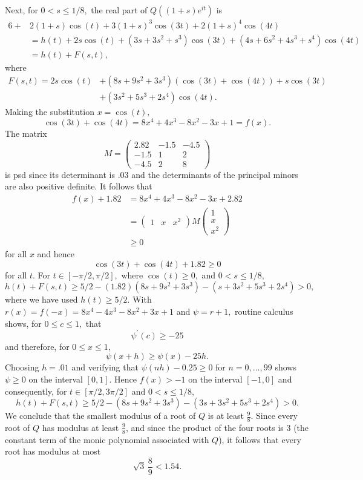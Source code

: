 \documentclass[a4paper,reqno,index]{amsart}
\numberwithin{equation}{section}
\theoremstyle{definition}
\begin{document}
Next, for $0<s \le 1/8,$ 
 the real part of $Q((1+s) e^{it})$ is
 \[
 \begin{split}
  6+ & 2(1+s)\cos(t)+3(1+s)^3 \cos(3t)+ 2(1+s)^4\cos(4t) 
  \\ &  = h(t) +  2s\cos(t) + (3s+3s^2+s^3)\cos(3t) + (4s+6s^2+4s^3+s^4)\cos(4t)
\\  & = h(t)+F(s,t), 
\end{split}
\]
where
\[
\begin{split}
 F(s,t)= 2s\cos(t) & + (8s+9s^2+3s^3)\left(\cos(3t)+\cos(4t)\right)
  + s\cos(3t) \\ & + (3s^2+5s^3+2s^4)\cos(4t).
 \end{split}
\]
 Making the substitution $x=\cos(t),$
\[
 \cos(3t)+\cos(4t)  = 8x^4+4x^3 -8x^2-3x+1 = f(x).
\]
  The matrix
 \[
   M=\begin{pmatrix} 2.82 & -1.5 & -4.5\\
      -1.5 & 1 & 2 \\ -4.5 & 2 & 8 \end{pmatrix}
 \]
 is psd since its determinant is $.03$ and 
 the determinants of the principal minors are also positive definite. It follows that
\begin{align*}
f(x) + 1.82 &= 8x^4+4x^3 -8x^2-3x+2.82  \\
&=\begin{pmatrix}
1 & x & x^2
\end{pmatrix} M \begin{pmatrix}
1 \\ x \\ x^2
\end{pmatrix}  \\
&\ge 0
\end{align*}
 for all $x$ and hence
\[
 \cos(3t)+\cos(4t) + 1.82 \ge 0
\]
 for all $t.$
  For $t\in [-\pi/2,\pi/2],$ where $\cos(t)\ge 0,$  and $0<s \le 1/8,$
\[
  h(t) +  F(s,t) \ge 
  5/2 -(1.82)(8s+9s^2+3s^3) - (s+3s^2+5s^3+2s^4) >0,
\]
where we have used $h(t)\ge 5/2.$
  With $r(x)=f(-x)= 8x^4-4x^3-8x^2+3x+1$ and
  $\psi=r+1,$ routine calculus shows, for $0\le c \le 1,$
  that
\[
 \psi^\prime(c) \ge -25
\]
  and therefore, for $0\le x \le 1,$
\[
  \psi(x+h) \ge \psi(x)-25h.
\]
  Choosing $h=.01$ and verifying that $\psi(nh)-0.25 \ge 0$
  for $n=0,\dots,99$ shows $\psi \ge 0$ on the interval
  $[0,1].$ Hence  $f(x) >-1$ on the interval $[-1,0]$
  and consequently, for $t\in [\pi/2,3\pi/2]$ and $0<s \le 1/8,$
\[
  h(t) + F(s,t) 
  \ge 5/2 - (8s+9s^2+3s^3) - (3s+3s^2+5s^3+2s^4) >0.
\]
We conclude that the smallest modulus of a root of \(Q\) is at least
\(\frac{9}{8}\). Since every root of \(Q\) has modulus at least
\(\frac{9}{8}\), and since the product of the four roots is \(3\)
(the constant term of the monic polynomial associated with \(Q\)),
it follows that every root has modulus at most
\begin{equation}
    \label{e:max-mod-Q}
\sqrt{3}\,\frac{8}{9}  < 1.54.
\end{equation}
\end{document}
